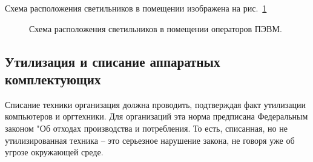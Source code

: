 Схема расположения светильников в помещении изображена на рис.~\ref{pic:room}
\begin{figure}[!htb]
\caption{Схема расположения светильников в помещении операторов ПЭВМ.}
\label{pic:room}
\end{figure}
\subsection{Утилизация и списание аппаратных комплектующих}
Списание техники организация должна проводить, подтверждая факт утилизации компьютеров и оргтехники. Для организаций эта норма предписана Федеральным законом "Об отходах производства и потребления. То есть, списанная, но не утилизированная техника – это серьезное нарушение закона, не говоря уже об  угрозе окружающей среде.

